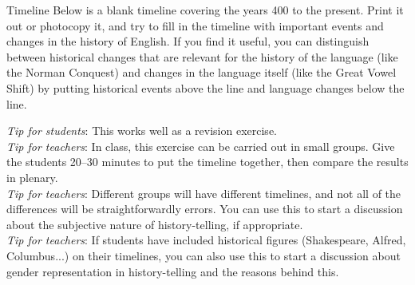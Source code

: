 \largerpage
\begin{exercises}{Timeline}
Below is a blank timeline covering the years 400 to the present. Print it out or photocopy it, and try to fill in the timeline with important events and changes in the history of English. If you find it useful, you can distinguish between historical changes that are relevant for the history of the language (like the Norman Conquest) and changes in the language itself (like the Great Vowel Shift) by putting historical events above the line and language changes below the line.\newpage

\begin{figure}[H]
\vspace*{2cm}
\vspace*{2cm}
\end{figure}

\noindent\emph{Tip for students}: This works well as a revision exercise.\\

\noindent\emph{Tip for teachers}: In class, this exercise can be carried out in small groups. Give the students 20--30 minutes to put the timeline together, then compare the results in plenary.\\

\noindent\emph{Tip for teachers}: Different groups will have different timelines, and not all of the differences will be straightforwardly errors. You can use this to start a discussion about the subjective nature of history-telling, if appropriate.\\

\noindent\emph{Tip for teachers}: If students have included historical figures (Shakespeare, Alfred, Columbus...) on their timelines, you can also use this to start a discussion about gender representation in history-telling and the reasons behind this.

\end{exercises}


